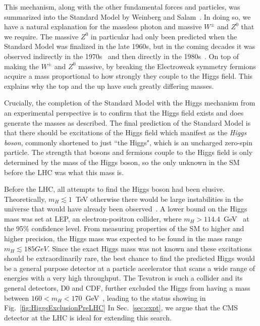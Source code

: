 This mechanism, along with the other fundamental forces and particles, was summarized into the Standard Model by Weinberg and Salam~\cite{Weinberg:1967,Salam:1968}. In doing so, we have a natural explanation for the massless photon and massive $W^{\pm}$ and $Z^{0}$ that we require. The massive $Z^{0}$ in particular had only been predicted when the Standard Model was finalized in the late 1960s, but in the coming decades it was observed indirectly in the 1970s~\cite{} and then directly in the 1980s~\cite{}. On top of making the $W^{\pm}$ and $Z^{0}$ massive, by breaking the Electroweak symmetry fermions acquire a mass proportional to how strongly they couple to the Higgs field. This explains why the top and the up have such greatly differing masses.

Crucially, the completion of the Standard Model with the Higgs mechanism from an experimental perspective is to confirm that the Higgs field exists and does generate the masses as described. The final prediction of the Standard Model is that there should be excitations of the Higgs field which manifest as the \textit{Higgs boson}, commonly shortened to just ``the Higgs", which is an uncharged zero-spin particle. The strength that bosons and fermions couple to the Higgs field is only determined by the mass of the Higgs boson, so the only unknown in the SM before the LHC was what this mass is.

Before the LHC, all attempts to find the Higgs boson had been elusive. Theoretically, $m_{H}\lesssim1$~TeV otherwise there would be large instabilities in the universe that would have already been observed~\cite{}. A lower bound on the Higgs mass was set at LEP, an electron-positron collider, where $m_{H}>114.4$~GeV~\cite{Barate:2003sz} at the 95\% confidence level. From measuring properties of the SM to higher and higher precision, the Higgs mass was expected to be found in the mass range $m_{H}\lesssim185GeV$. Since the exact Higgs mass was not known and these excitations should be extraordinarily rare, the best chance to find the predicted Higgs would be a general purpose detector at a particle accelerator that scans a wide range of energies with a very high throughput. The Tevatron is such a collider and its general detectors, D0 and CDF, further excluded the Higgs from having a mass between $160<m_{H}<170$~GeV~\cite{Aaltonen:2010yv}, leading to the status showing in Fig.~\ref{fig:HiggsExclusionPreLHC} In Sec.~\ref{sec:expt}, we argue that the CMS detector at the LHC is ideal for extending this search.

